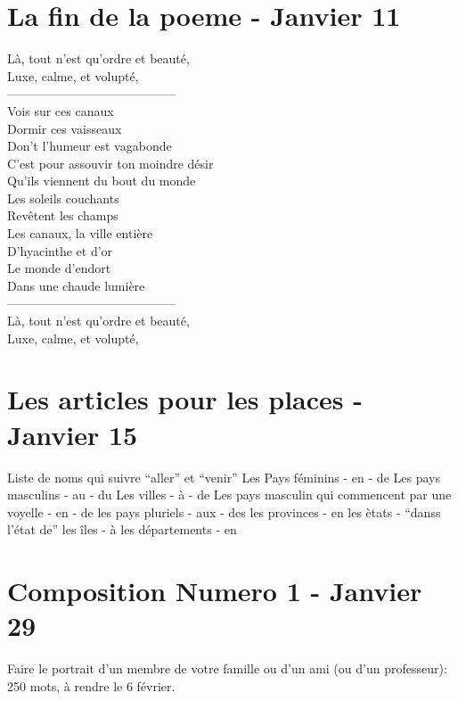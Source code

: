 \documentclass{report}
\begin{document}
\section{La fin de la poeme - Janvier 11}

\begin{center}
L\`a, tout n'est qu'ordre et beaut\'e,\\
Luxe, calme, et volupt\'e,\\
-----------------------------------------\\
Vois sur ces canaux\\
Dormir ces vaisseaux\\
Don't l'humeur est vagabonde\\
C'est pour assouvir ton moindre d\'esir\\
Qu'ils viennent du bout du monde\\
Les soleils couchants\\
Rev\^etent les champs\\
Les canaux, la ville enti\`ere\\
D'hyacinthe et d'or\\
Le monde d'endort\\
Dans une chaude lumi\`ere\\
-----------------------------------------\\	
L\`a, tout n'est qu'ordre et beaut\'e,\\
Luxe, calme, et volupt\'e,\\
\end{center}

\section{Les articles pour les places - Janvier 15}

Liste de noms qui suivre ``aller'' et ``venir''
Les Pays f\'eminins - en - de
Les pays masculins - au - du
Les villes - \`a - de
Les pays masculin qui commencent par une voyelle - en - de
les pays pluriels - aux - des
les provinces - en
les \`etats - ``danss l'\'etat de''
les \^iles - \`a
les d\'epartements - en

\section{Composition Numero 1 - Janvier 29}

Faire le portrait d'un membre de votre famille ou d'un ami (ou d'un professeur): 250 mots, \`a rendre le 6 f\'evrier. 
\end{document}
